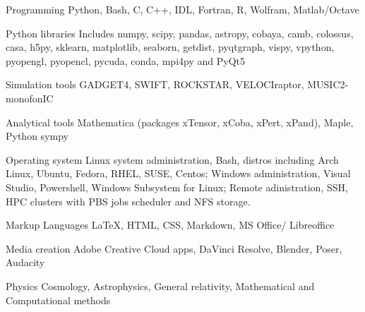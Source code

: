 



\begin{cvskills}

\cvskill
{Programming} %
{ Python, Bash, C, C++, IDL, Fortran, R, Wolfram, Matlab/Octave
} %

\cvskill
{Python libraries}
{Includes numpy, scipy, pandas, astropy, cobaya, camb, colossus, casa, h5py, sklearn, matplotlib, seaborn, \break getdist, pyqtgraph, vispy, vpython, pyopengl, pyopencl, pycuda, conda, mpi4py and PyQt5}

\cvskill
{Simulation tools}
{GADGET4, SWIFT, ROCKSTAR, VELOCIraptor, MUSIC2-monofonIC}

\cvskill
{Analytical tools}
{Mathematica (packages xTensor, xCoba, xPert, xPand), Maple, Python sympy}

\cvskill
{Operating system}
{Linux system administration, Bash, distros including Arch Linux, Ubuntu, Fedora, RHEL, SUSE, Centos; \break Windows administration, Visual Studio, Powershell, Windows Subsystem for Linux; \break Remote adinistration, SSH, HPC clusters with PBS jobs scheduler and NFS storage.}

\cvskill
{Markup Languages}
{LaTeX, HTML, CSS, Markdown, MS Office/ Libreoffice}

\cvskill
{Media creation} %
{Adobe Creative Cloud apps, DaVinci Resolve, Blender, Poser, Audacity} %




\end{cvskills}


\begin{cvskills}

\cvskill
{Physics}
{Cosmology, Astrophysics, General relativity, Mathematical and Computational methods}

\end{cvskills}